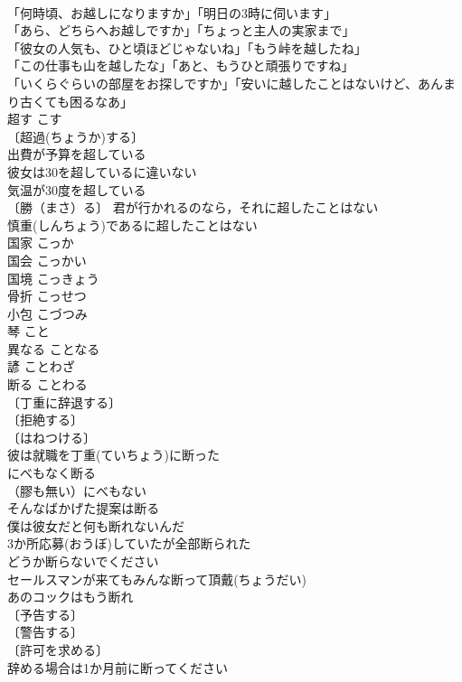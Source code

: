 \documentclass[8pt]{extreport}
\begin{document}
\begin{CJK}{UTF8}{min}
\\	「何時頃、お越しになりますか」「明日の3時に伺います」 
\\	「あら、どちらへお越しですか」「ちょっと主人の実家まで」 
\\	「彼女の人気も、ひと頃ほどじゃないね」「もう峠を越したね」 
\\	「この仕事も山を越したな」「あと、もうひと頑張りですね」 
\\	「いくらぐらいの部屋をお探しですか」「安いに越したことはないけど、あんまり古くても困るなあ」 
\\	超す	こす	
\\	〔超過(ちょうか)する〕
\\	出費が予算を超している 
\\	彼女は30を超しているに違いない 
\\	気温が30度を超している 
\\	〔勝（まさ）る〕 君が行かれるのなら，それに超したことはない 
\\	慎重(しんちょう)であるに超したことはない 
\\	国家	こっか	
\\	国会	こっかい	
\\	国境	こっきょう	
\\	骨折	こっせつ	
\\	小包	こづつみ	
\\	琴	こと	
\\	異なる	ことなる	
\\	諺	ことわざ	
\\	断る	ことわる	
\\	〔丁重に辞退する〕
\\	〔拒絶する〕
\\	〔はねつける〕
\\	彼は就職を丁重(ていちょう)に断った 
\\	にべもなく断る 
\\	（膠も無い）にべもない　
\\	そんなばかげた提案は断る 
\\	僕は彼女だと何も断れないんだ 
\\	3か所応募(おうぼ)していたが全部断られた 
\\	どうか断らないでください 
\\	セールスマンが来てもみんな断って頂戴(ちょうだい) 
\\	あのコックはもう断れ 
\\	〔予告する〕
\\	〔警告する〕
\\	〔許可を求める〕
\\	辞める場合は1か月前に断ってください 

\end{CJK}
\end{document}
